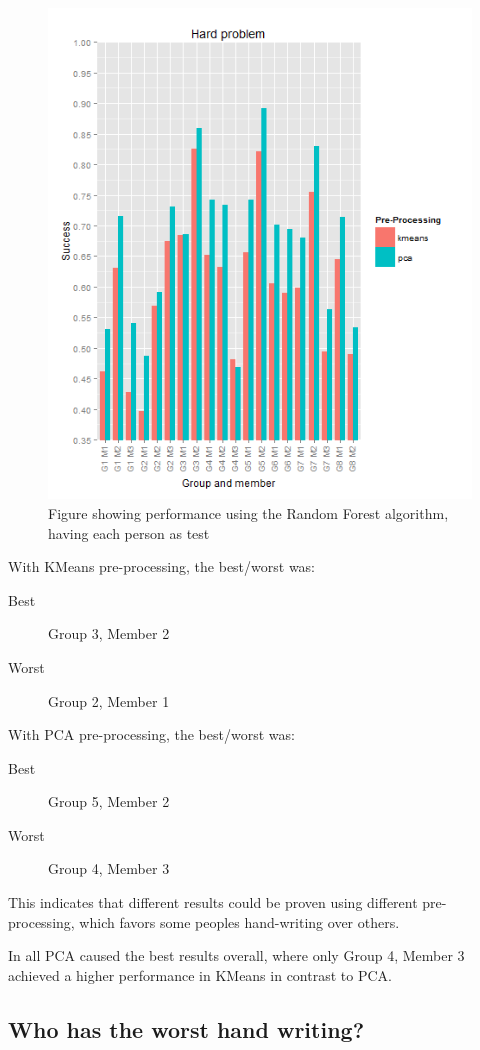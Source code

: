 \documentclass[report]{subfiles}
\begin{document}
\begin{figure}[H]
  \centering
  \includegraphics[width=1\textwidth]{images/rf_hard}
  \caption{Figure showing performance using the Random Forest algorithm, having each person as test}
  \label{fig:rfHardProblem}
\end{figure}

With KMeans pre-processing, the best/worst was:
\begin{description}
\item[Best] Group 3, Member 2
\item[Worst] Group 2, Member 1
\end{description}

With PCA pre-processing, the best/worst was:
\begin{description}
\item[Best] Group 5, Member 2
\item[Worst] Group 4, Member 3
\end{description}


This indicates that different results could be proven using different pre-processing, which favors some peoples hand-writing over others. 

In all PCA caused the best results overall, where only Group 4, Member 3 achieved a higher performance in KMeans in contrast to PCA.

\subsection{Who has the worst hand writing?}
\end{document}
